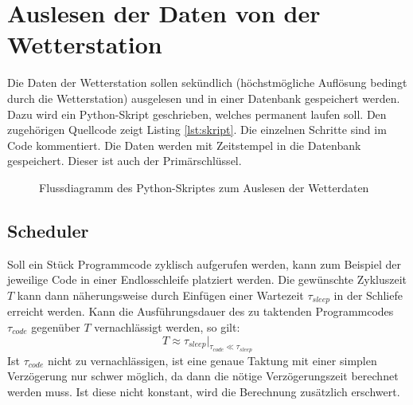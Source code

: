 \section{Auslesen der Daten von der Wetterstation}
Die Daten der Wetterstation sollen sekündlich (höchstmögliche Auflösung bedingt durch die Wetterstation) ausgelesen und in einer Datenbank gespeichert werden. Dazu wird ein Python-Skript geschrieben, welches permanent laufen soll. Den zugehörigen Quellcode zeigt Listing \ref{lst:skript}. Die einzelnen Schritte sind im Code kommentiert. Die Daten werden mit Zeitstempel in die Datenbank gespeichert. Dieser ist auch der Primärschlüssel.

\newpage

\vspace*{\fill}
\begin{figure}[H]
	\centering
	
	\caption{Flussdiagramm des Python-Skriptes zum Auslesen der Wetterdaten}
	\label{fig:logDiagram}
\end{figure}

\vspace*{\fill}




\newpage



\mbox

\newpage

\subsection{Scheduler}
Soll ein Stück Programmcode zyklisch aufgerufen werden, kann zum Beispiel der jeweilige Code in einer Endlosschleife platziert werden. Die gewünschte Zykluszeit $T$ kann dann näherungsweise durch Einfügen einer Wartezeit $\tau_{sleep}$ in der Schliefe erreicht werden. Kann die Ausführungsdauer des zu taktenden Programmcodes $\tau_{code}$ gegenüber $T$ vernachlässigt werden, so gilt: \begin{equation}
T\approx\tau_{sleep} \bigg\rvert_{\tau_{code} \ll \tau_{sleep}}
\end{equation}
Ist $\tau_{code}$ nicht zu vernachlässigen, ist eine genaue Taktung mit einer simplen Verzögerung nur schwer möglich, da dann die nötige Verzögerungszeit berechnet werden muss. Ist diese nicht konstant, wird die Berechnung zusätzlich erschwert.

